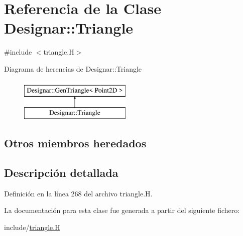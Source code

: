 \hypertarget{class_designar_1_1_triangle}{}\section{Referencia de la Clase Designar\+:\+:Triangle}
\label{class_designar_1_1_triangle}


{\ttfamily \#include $<$triangle.\+H$>$}

Diagrama de herencias de Designar\+:\+:Triangle\begin{figure}[H]
\begin{center}
\leavevmode
\includegraphics[height=2.000000cm]{class_designar_1_1_triangle}
\end{center}
\end{figure}
\subsection*{Otros miembros heredados}


\subsection{Descripción detallada}


Definición en la línea 268 del archivo triangle.\+H.



La documentación para esta clase fue generada a partir del siguiente fichero\+:\begin{DoxyCompactItemize}
\item 
include/\hyperlink{triangle_8_h}{triangle.\+H}\end{DoxyCompactItemize}

